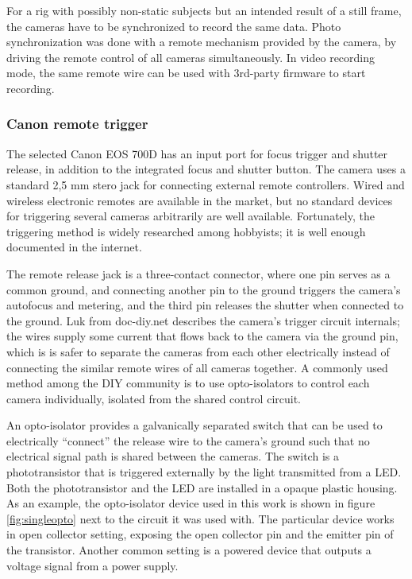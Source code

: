 For a rig with possibly non-static subjects but an intended result of a still frame, the cameras have to be synchronized to record the same data.
Photo synchronization was done with a remote mechanism provided by the camera, by driving the remote control of all cameras simultaneously.
In video recording mode, the same remote wire can be used with 3rd-party firmware to start recording.


\subsubsection{Canon remote trigger} %

The selected Canon EOS 700D has an input port for focus trigger and shutter release, in addition to the integrated focus and shutter button.
The camera uses a standard 2,5 mm stero jack for connecting external remote controllers.
Wired and wireless electronic remotes are available in the market, but no standard devices for triggering several cameras arbitrarily are well available. %
Fortunately, the triggering method is widely researched among hobbyists; it is well enough documented in the internet.

The remote release jack is a three-contact connector, where one pin serves as a common ground, and connecting another pin to the ground triggers the camera's autofocus and metering, and the third pin releases the shutter when connected to the ground.
Luk from doc-diy.net \cite{docdiy} describes the camera's trigger circuit internals; the wires supply some current that flows back to the camera via the ground pin, which is is safer to separate the cameras from each other electrically instead of connecting the similar remote wires of all cameras together.
A commonly used method among the DIY community is to use opto-isolators to control each camera individually, isolated from the shared control circuit.

An opto-isolator provides a galvanically separated switch that can be used to electrically ``connect'' the release wire to the camera's ground such that no electrical signal path is shared between the cameras.
The switch is a phototransistor that is triggered externally by the light transmitted from a LED.
Both the phototransistor and the LED are installed in a opaque plastic housing.
As an example, the opto-isolator device used in this work is shown in figure \ref{fig:singleopto} next to the circuit it was used with.
The particular device works in open collector setting, exposing the open collector pin and the emitter pin of the transistor.
Another common setting is a powered device that outputs a voltage signal from a power supply.

